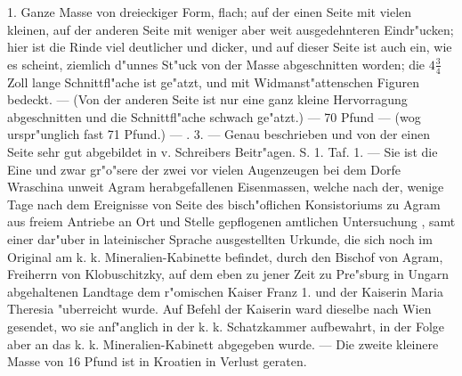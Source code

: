 \documentclass[a4paper, 11pt, oneside, polutonikogreek, german]{article}
\begin{document}
1. Ganze Masse von dreieckiger Form, flach; auf der einen Seite mit vielen kleinen, auf der anderen Seite mit weniger aber weit ausgedehnteren Eindr"ucken; hier ist die Rinde viel deutlicher und dicker, und auf dieser Seite ist auch ein, wie es scheint, ziemlich d"unnes St"uck von der Masse abgeschnitten worden; die $4\frac{3}{4}$ Zoll lange Schnittfl"ache ist ge"atzt, und mit Widmanst"attenschen Figuren bedeckt. --- (Von der anderen Seite ist nur eine ganz kleine Hervorragung abgeschnitten und die Schnittfl"ache schwach ge"atzt.) --- 70 Pfund --- (wog urspr"unglich fast 71 Pfund.) --- . 3. --- Genau beschrieben und von der einen Seite sehr gut abgebildet in v. Schreibers Beitr"agen. S. 1. Taf. 1. --- Sie ist die Eine und zwar gr"o"sere der zwei vor vielen Augenzeugen bei dem Dorfe Wraschina unweit Agram herabgefallenen Eisenmassen, welche nach der, wenige Tage nach dem Ereignisse von Seite des bisch"oflichen Konsistoriums zu Agram aus freiem Antriebe an Ort und Stelle gepflogenen amtlichen Untersuchung , samt einer dar"uber in lateinischer Sprache ausgestellten Urkunde, die sich noch im Original am k. k. Mineralien-Kabinette befindet, durch den Bischof von Agram, Freiherrn von Klobuschitzky, auf dem eben zu jener Zeit zu Pre"sburg in Ungarn abgehaltenen Landtage dem r"omischen Kaiser Franz 1. und der Kaiserin Maria Theresia "uberreicht wurde. Auf Befehl der Kaiserin ward dieselbe nach Wien gesendet, wo sie anf"anglich in der k. k. Schatzkammer aufbewahrt, in der Folge aber an das k. k. Mineralien-Kabinett abgegeben wurde. --- Die zweite kleinere Masse von 16 Pfund ist in Kroatien in Verlust geraten.
\end{document}
